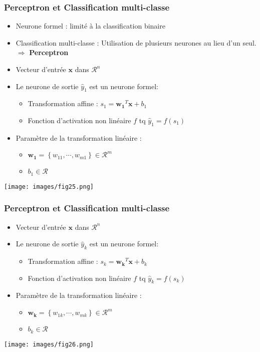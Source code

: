 \documentclass[9pt]{beamer}
\newcommand \ve[1]{\mathbf{#1}}
\begin{document}
\begin{frame}
\frametitle{Perceptron et Classification multi-classe}
\begin{minipage}[c]{0.5\linewidth}
\begin{itemize}
\item Neurone formel : limité à la classification binaire
\item Classification multi-classe : Utilisation de plusieurs neurones au lieu d'un seul. $\Rightarrow$ \textbf{Perceptron}
\item Vecteur d'entrée $\ve{x}$ dans $\mathcal{R}^n$
\item Le neurone de sortie $\hat{y}_1$ est un neurone formel:
\begin{itemize}
\item Transformation affine : $s_1=\ve{w_1}^T\ve{x}+b_1$
\item Fonction d'activation non linéaire $f$ tq $\hat{y}_1=f(s_1)$
\end{itemize}
\item Paramètre de la transformation linéaire : 
\begin{itemize}
\item $\ve{w_1} = \left\lbrace w_{11}, \cdots ,w_{m1}\right\rbrace \in \mathcal{R}^m$
\item $b_1 \in \mathcal{R}$ 
\end{itemize}
\end{itemize}
\end{minipage}
\begin{minipage}[c]{0.4\linewidth}
\texttt{[image: images/fig25.png]}
\end{minipage}
\end{frame}

\begin{frame}
\frametitle{Perceptron et Classification multi-classe}
\begin{minipage}[c]{0.5\linewidth}
\begin{itemize}
\item Vecteur d'entrée $\ve{x}$ dans $\mathcal{R}^n$
\item Le neurone de sortie $\hat{y}_k$ est un neurone formel:
\begin{itemize}
\item Transformation affine : $s_k=\ve{w_k}^T\ve{x}+b_k$
\item Fonction d'activation non linéaire $f$ tq $\hat{y}_k=f(s_k)$
\end{itemize}
\item Paramètre de la transformation linéaire : 
\begin{itemize}
\item $\ve{w_k} = \left\lbrace w_{1k}, \cdots ,w_{mk}\right\rbrace \in \mathcal{R}^m$
\item $b_k \in \mathcal{R}$ 
\end{itemize}
\end{itemize}
\end{minipage}
\begin{minipage}[c]{0.4\linewidth}
\texttt{[image: images/fig26.png]}
\end{minipage}
\end{frame}
\end{document}
